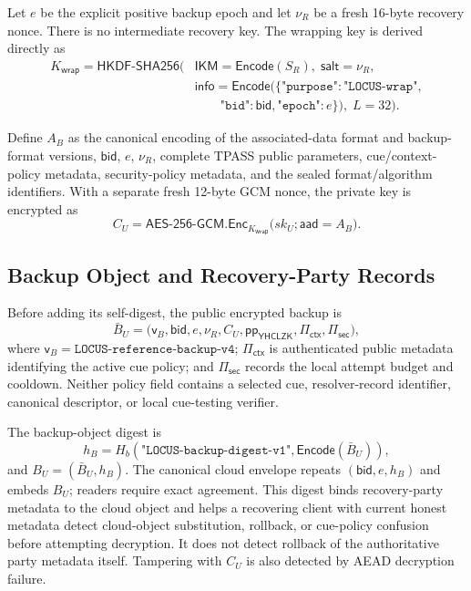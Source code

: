 \documentclass[sigconf,anonymous]{acmart}
\newcommand{\Enc}{\mathsf{Enc}}
\newcommand{\Encode}{\mathsf{Encode}}
\newcommand{\YHCLZK}{\mathsf{YHCLZK}}
\begin{document}
Let \(e\) be the explicit positive backup epoch and let \(\nu_R\) be a fresh
16-byte recovery nonce. There is no intermediate recovery key. The wrapping key
is derived directly as
\begin{equation}
\begin{aligned}
K_{\mathsf{wrap}} =
\mathsf{HKDF\mbox{-}SHA256}\big(
&\mathsf{IKM}=\Encode(S_R),\;
\mathsf{salt}=\nu_R,\\
&\mathsf{info}=\Encode(
\{\texttt{"purpose"}:\texttt{"LOCUS-wrap"},\\
&\qquad\texttt{"bid"}:\mathsf{bid},
\texttt{"epoch"}:e\}),\;L=32\big).
\end{aligned}
\label{eq:Kwrap}
\end{equation}

Define \(A_B\) as the canonical encoding of the associated-data format and
backup-format versions, \(\mathsf{bid}\), \(e\), \(\nu_R\), complete TPASS public
parameters, cue/context-policy metadata, security-policy metadata, and the sealed
format/algorithm identifiers. With a separate fresh 12-byte GCM nonce, the
private key is encrypted as
\begin{equation}
C_U =
\mathsf{AES\mbox{-}256\mbox{-}GCM}.\Enc_{K_{\mathsf{wrap}}}
\big(
sk_U;
\mathsf{aad}=A_B
\big).
\label{eq:private-key-encryption}
\end{equation}

\subsection{Backup Object and Recovery-Party Records}

Before adding its self-digest, the public encrypted backup is
\[
\bar B_U =
\big(
\mathsf{v}_B,
\mathsf{bid},
e,
\nu_R,
C_U,
\mathsf{pp}_{\YHCLZK},
\Pi_{\mathsf{ctx}},
\Pi_{\mathsf{sec}}
\big),
\]
where \(\mathsf{v}_B=\texttt{LOCUS-reference-backup-v4}\);
\(\Pi_{\mathsf{ctx}}\) is authenticated public metadata identifying the active
cue policy; and
\(\Pi_{\mathsf{sec}}\) records the local attempt budget and cooldown. Neither
policy field contains a selected cue, resolver-record identifier, canonical
descriptor, or local cue-testing verifier.

The backup-object digest is
\[
h_B=H_b(\texttt{"LOCUS-backup-digest-v1"},\Encode(\bar B_U)),
\]
and \(B_U=(\bar B_U,h_B)\). The canonical cloud envelope repeats
\((\mathsf{bid},e,h_B)\) and embeds \(B_U\); readers require exact agreement.
This digest binds recovery-party metadata to the cloud object and helps a recovering client with current honest metadata detect cloud-object substitution, rollback, or cue-policy confusion before attempting decryption. It does not detect rollback of the authoritative party metadata itself. Tampering with \(C_U\) is also detected by AEAD decryption failure.
\end{document}
